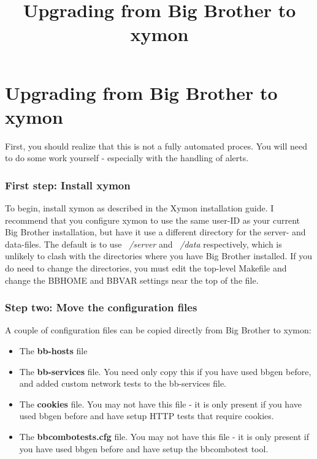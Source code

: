 \title{Upgrading from Big Brother to xymon}
\section{Upgrading from Big Brother to xymon}


 First, you should realize that this is not a fully automated
 proces. You will need to do some work yourself - especially with the
 handling of alerts.

\subsubsection{First step: Install xymon}


 To begin, install xymon as described in the Xymon installation
 guide. I recommend that you configure xymon to use the same user-ID
 as your current Big Brother installation, but have it use a different
 directory for the server- and data-files. The default is to use
 \emph{~/server} and \emph{~/data} respectively, which is unlikely to
 clash with the directories where you have Big Brother installed. If
 you do need to change the directories, you must edit the top-level
 Makefile and change the BBHOME and BBVAR settings near the top of the
 file.

\subsubsection{Step two: Move the configuration files}


 A couple of configuration files can be copied directly from Big
 Brother to xymon:

\begin{itemize}

\item The \textbf{bb-hosts}
 file 
\item The \textbf{bb-services} file. You need only copy this if you
have used bbgen before, and added custom network tests to the
bb-services file.
\item The \textbf{cookies} file. You may not have this file - it is
only present if you have used bbgen before and have setup HTTP tests
that require cookies.

\item The \textbf{bbcombotests.cfg} file. You may not have this file -
it is only present if you have used bbgen before and have setup the
bbcombotest tool.


\end{itemize}



